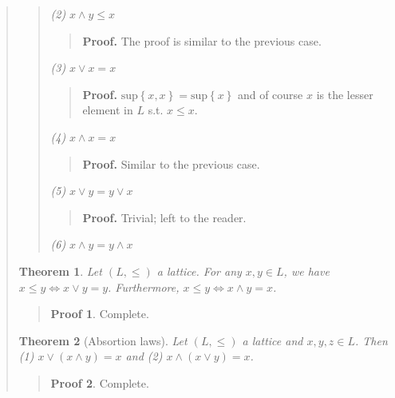 \documentclass[a4paper, 12pt]{article}
\newtheorem{theorem}{Theorem}
\theoremstyle{definition}
\theoremstyle{definition}
\theoremstyle{definition}
\newtheorem{pro}{Proof}
\begin{document}
\begin{quote}
\begin{quote}
    \textit{(2)} $x \land  y \leq x$
    \begin{quote}
        \textbf{Proof.} The proof is similar to the previous case.
    \end{quote}

    \textit{(3)} $x \lor  x = x$

    \begin{quote}
        \textbf{Proof.} $\text{sup}\left\{ x, x \right\} = \text{sup}\left\{ x
        \right\} $ and of course $x$ is the lesser element in $L$ s.t. $x \leq
        x$.
    \end{quote}

    \textit{(4)} $x \land  x = x$
    \begin{quote}
        \textbf{Proof.} Similar to the previous case.
    \end{quote}


    \textit{(5)} $x \lor y = y \lor  x$
    
    \begin{quote}
        \textbf{Proof.} Trivial; left to the reader.
    \end{quote}

    \textit{(6)} $x \land  y = y \land  x$


\end{quote}



\begin{theorem}
    Let $(L, \leq)$ a lattice. For any $x, y \in L$, we have $x \leq y \iff x
    \lor y = y$. Furthermore, $x \leq y \iff x \land y = x$.
\end{theorem}


\small
\begin{quote}

\begin{pro}
    Complete.
\end{pro}

\end{quote}
\normalsize


\begin{theorem}[Absortion laws]
    Let $(L, \leq)$ a lattice and $x, y, z \in L$. Then \textit{(1)} $x \lor (x
    \land y) = x$ and \textit{(2)} $x \land (x \lor y) = x$.
\end{theorem}


\small
\begin{quote}

\begin{pro}
    Complete.
\end{pro}


\end{quote}
\end{quote}
\end{document}
